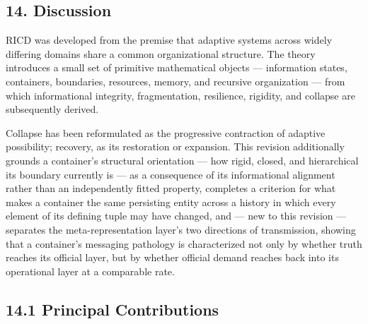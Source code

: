 \documentclass[
]{article}
\begin{document}
\hypertarget{discussion}{%
\subsection{14. Discussion}\label{discussion}}

RICD was developed from the premise that adaptive systems across widely
differing domains share a common organizational structure. The theory
introduces a small set of primitive mathematical objects --- information
states, containers, boundaries, resources, memory, and recursive
organization --- from which informational integrity, fragmentation,
resilience, rigidity, and collapse are subsequently derived.

Collapse has been reformulated as the progressive contraction of
adaptive possibility; recovery, as its restoration or expansion. This
revision additionally grounds a container's structural orientation ---
how rigid, closed, and hierarchical its boundary currently is --- as a
consequence of its informational alignment rather than an independently
fitted property, completes a criterion for what makes a container the
same persisting entity across a history in which every element of its
defining tuple may have changed, and --- new to this revision ---
separates the meta-representation layer's two directions of
transmission, showing that a container's messaging pathology is
characterized not only by whether truth reaches its official layer, but
by whether official demand reaches back into its operational layer at a
comparable rate.

\hypertarget{principal-contributions}{%
\subsection{14.1 Principal
Contributions}\label{principal-contributions}}
\end{document}
